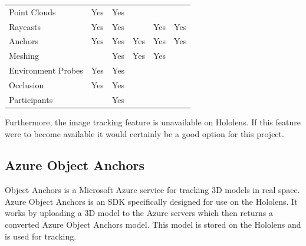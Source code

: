 \documentclass{l4proj}
\begin{document}
\begin{table}[hbt!]
\begin{tabular}{|l|c|cc|cc|}
Point Clouds                                            & Yes              & \multicolumn{1}{c|}{Yes}          &                   & \multicolumn{1}{c|}{}                  &                     \\
Raycasts                                                & Yes              & \multicolumn{1}{c|}{Yes}          &                   & \multicolumn{1}{c|}{Yes}               & Yes                 \\
Anchors                                                 & Yes              & \multicolumn{1}{c|}{Yes}          & Yes               & \multicolumn{1}{c|}{Yes}               & Yes                 \\
Meshing                                                 &                  & \multicolumn{1}{c|}{Yes}          & Yes               & \multicolumn{1}{c|}{Yes}               &                     \\
Environment Probes                                      & Yes              & \multicolumn{1}{c|}{Yes}          &                   & \multicolumn{1}{c|}{}                  &                     \\
Occlusion                                               & Yes              & \multicolumn{1}{c|}{Yes}          &                   & \multicolumn{1}{c|}{}                  &                     \\
Participants                                            &                  & \multicolumn{1}{c|}{Yes}          &                   & \multicolumn{1}{c|}{}                  &                     \\ \hline
\end{tabular}
\end{table}

Furthermore, the image tracking feature is unavailable on Hololens. If this feature were to become available it would certainly be a good option for this project.

\subsection{Azure Object Anchors}

Object Anchors is a Microsoft Azure service for tracking 3D models in real space. Azure Object Anchors is an SDK specifically designed for use on the Hololens. It works by uploading a 3D model to the Azure servers which then returns a converted Azure Object Anchors model. This model is stored on the Hololens and is used for tracking. 
\end{document}

